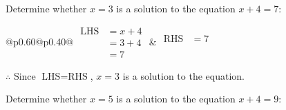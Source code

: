 \documentclass[12pt]{article}
\newcounter{minipagecount}
\begin{document}
\begin{multicols}{2}
\begin{minipage}[t]{0.40\textwidth}
    \noindent Determine whether \(x = 3\) is a solution to the equation \(x + 4 = 7\):
    \vspace{2pt}  %

    \noindent
    \renewcommand{\arraystretch}{1.3} %
    \begin{tabular}{@{}p{0.60\linewidth}@{}p{0.40\linewidth}@{}}
        \(\begin{aligned}
            \text{LHS} &= x + 4 \\
                    &= 3 + 4 \\
                    &= 7 
        \end{aligned}\) &
        \(\begin{aligned}
            \text{RHS} &= 7\\
                    & \\
                    &
        \end{aligned}\)
    \end{tabular}
    \renewcommand{\arraystretch}{1.0} %
    \vspace{2pt}  %

    \noindent \(\therefore\) Since \(\text{LHS} = \text{RHS}\), \(x = 3\) is  a solution to the equation.

\end{minipage}

\vspace*{0.5ex}
\vfill{}
\noindent{(\theminipagecount)}\hspace{0.1mm} %
\begin{minipage}[t]{0.40\textwidth} %

    \noindent Determine whether \(x = 5\) is a solution to the equation \(x + 4 = 9\):
    \vspace{2pt}  %


\end{minipage}
\end{multicols}
\end{document}

